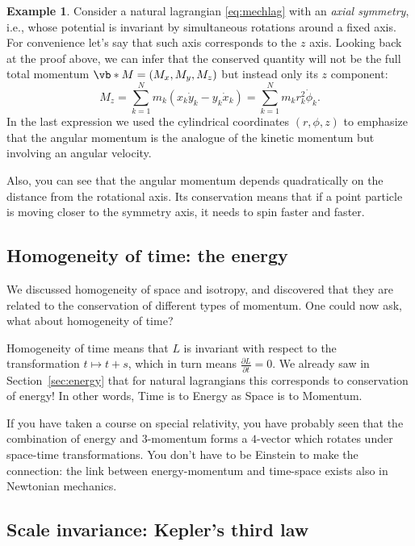 \documentclass[english,fontsize=11pt,paper=b5]{scrbook}
\numberwithin{equation}{chapter}
\theoremstyle{definition}
\newtheorem{example}{Example}[chapter]
\begin{document}
    \begin{example}
      Consider a natural lagrangian \eqref{eq:mechlag} with an \emph{axial symmetry}, i.e., whose potential is invariant by simultaneous rotations around a fixed axis.
      For convenience let's say that such axis corresponds to the $z$ axis.
      Looking back at the proof above, we can infer that the conserved quantity will not be the full total momentum $\vb*{M} = (M_x, M_y, M_z)$ but instead only its $z$ component:
      \begin{equation}
        M_z = \sum_{k=1}^N m_k\left(x_k \dot y_k - y_k \dot x_k\right) =
        \sum_{k=1}^N m_k r_k^2 \dot \phi_k.
      \end{equation}
      In the last expression we used the cylindrical coordinates $(r, \phi, z)$ to emphasize that the angular momentum is the analogue of the kinetic momentum but involving an angular velocity.

      Also, you can see that the angular momentum depends quadratically on the distance from the rotational axis. Its conservation means that if a point particle is moving closer to the symmetry axis, it needs to spin faster and faster.
    \end{example}

    \subsection{Homogeneity of time: the energy}

    We discussed homogeneity of space and isotropy, and discovered that they are related to the conservation of different types of momentum.
    One could now ask, what about homogeneity of time?

    Homogeneity of time means that $L$ is invariant with respect to the transformation $t\mapsto t+s$, which in turn means $\frac{\partial L}{\partial t} = 0$. We already saw in Section~\ref{sec:energy} that for natural lagrangians this corresponds to conservation of energy! In other words, Time is to Energy as Space is to Momentum.

    If you have taken a course on special relativity, you have probably seen that the combination of energy and $3$-momentum forms a $4$-vector which rotates under space-time transformations. You don't have to be Einstein to make the connection: the link between energy-momentum and time-space exists also in Newtonian mechanics.

    \subsection{Scale invariance: Kepler's third law}
\end{document}
